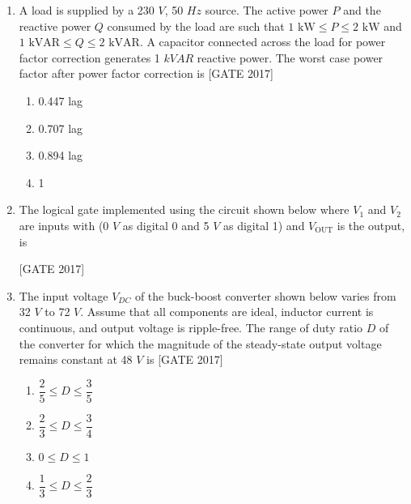 \documentclass[journal,12pt,onecolumn]{IEEEtran}
\theoremstyle{remark}
\begin{document}
\begin{enumerate}
\hfill{[GATE 2017]}
\begin{multicols}{4}
\begin{enumerate}
    \item $ \overline{B} \overline{D} + BCD $
    \item $ \overline{B} D + AB $
    \item $ \overline{B} D + ABC $
    \item $ B \overline{D} + ABC $
\end{enumerate}
\end{multicols}
\item A load is supplied by a 230 $V$, 50 $Hz$ source. The active power $ P $ and the reactive power $ Q $ consumed by the load are such that $1 \text{ kW} \leq P \leq 2 \text{ kW}$ and $ 1 \text{ kVAR} \leq Q \leq 2 \text{ kVAR}$. A capacitor connected across the load for power factor correction generates 1 $kVAR$ reactive power. The worst case power factor after power factor correction is
\hfill{[GATE 2017]} 
\begin{multicols}{4}
 \begin{enumerate}
    \item 0.447 lag
    \item 0.707 lag
    \item 0.894 lag
    \item 1
\end{enumerate}
\end{multicols}

\item The logical gate implemented using the circuit shown below where $ V_1$ and $ V_2 $ are inputs with (0 $V$ as digital 0 and 5 $V$ as digital 1) and $ V_{\text{OUT}} $ is the output, is \\ \newpage

\hfill{[GATE 2017]}
\item The input voltage $V_{DC}$ of the buck-boost converter shown below varies from 32 $V$ to 72 $V$. Assume that all components are ideal, inductor current is continuous, and output voltage is ripple-free. The range of duty ratio $D$ of the converter for which the magnitude of the steady-state output voltage remains constant at 48 $V$ is
\hfill{[GATE 2017]}

\begin{multicols}{4}
\begin{enumerate}
    \item $ \dfrac{2}{5} \leq D \leq \dfrac{3}{5} $
    \item $ \dfrac{2}{3} \leq D \leq \dfrac{3}{4} $
    \item $ 0 \leq D \leq 1 $
    \item $ \dfrac{1}{3} \leq D \leq \dfrac{2}{3} $
\end{enumerate}

\end{multicols}




\end{enumerate}
\end{document}
